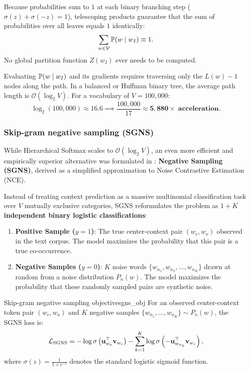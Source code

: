 \documentclass[../../../main.tex]{subfiles}
\begin{document}
Because probabilities sum to $1$ at each binary branching step ($\sigma(z) + \sigma(-z) = 1$), telescoping products guarantee that the sum of probabilities over all leaves equals $1$ identically:
\begin{equation}
\label{eq:hierarchical_norm_proof}
\sum_{w \in \mathcal{V}} \mathbb{P}(w \mid w_I) \equiv 1.
\end{equation}
No global partition function $Z(w_I)$ ever needs to be computed.


Evaluating $\mathbb{P}(w \mid w_I)$ and its gradients requires traversing only the $L(w) - 1$ nodes along the path. In a balanced or Huffman binary tree, the average path length is $\mathcal{O}(\log_2 V)$. For a vocabulary of $V = 100{,}000$:
\begin{equation}
\label{eq:hierarchical_speedup}
\log_2(100{,}000) \approx 16.6 \implies \frac{100{,}000}{17} \approx \mathbf{5{,}880\times \text{ acceleration}}.
\end{equation}

\subsubsection{Skip-gram negative sampling (SGNS)}
\label{subsec:sgns_formulation}

While Hierarchical Softmax scales to $\mathcal{O}(\log_2 V)$, an even more efficient and empirically superior alternative was formulated in \cite{mikolov2013distributed}: \textbf{Negative Sampling (SGNS)}, derived as a simplified approximation to Noise Contrastive Estimation (NCE).

Instead of treating context prediction as a massive multinomial classification task over $V$ mutually exclusive categories, SGNS reformulates the problem as \textbf{$1 + K$ independent binary logistic classifications}:
\begin{enumerate}
    \item \textbf{Positive Sample ($y = 1$)}: The true center-context pair $(w_c, w_o)$ observed in the text corpus. The model maximizes the probability that this pair is a true co-occurrence.
    \item \textbf{Negative Samples ($y = 0$)}: $K$ noise words $\{w_{n_1}, w_{n_2}, \dots, w_{n_K}\}$ drawn at random from a noise distribution $P_n(w)$. The model maximizes the probability that these randomly sampled pairs are synthetic noise.
\end{enumerate}

\begin{definition}{Skip-gram negative sampling objective}{sgns_obj}
For an observed center-context token pair $(w_c, w_o)$ and $K$ negative samples $\{w_{n_1}, \dots, w_{n_K}\} \sim P_n(w)$, the SGNS loss is:
\begin{equation}
\label{eq:sgns_loss_display}
\mathcal{L}_{\text{SGNS}} = -\log \sigma\left( \mathbf{u}_{w_o}^\top \mathbf{v}_{w_c} \right) - \sum_{k=1}^K \log \sigma\left( -\mathbf{u}_{w_{n_k}}^\top \mathbf{v}_{w_c} \right),
\end{equation}
where $\sigma(z) = \frac{1}{1 + e^{-z}}$ denotes the standard logistic sigmoid function.
\end{definition}
\end{document}
